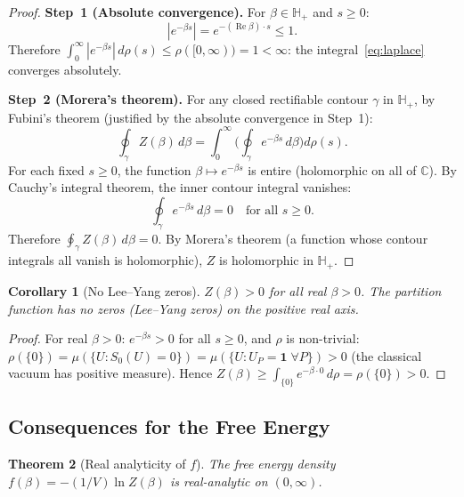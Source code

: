 \documentclass[12pt,a4paper]{article}
\theoremstyle{plain}
\newtheorem{theorem}{Theorem}[section]
\newtheorem{corollary}[theorem]{Corollary}
\theoremstyle{definition}
\theoremstyle{remark}
\begin{document}
\begin{proof}
\textbf{Step~1 (Absolute convergence).} For $\beta\in\mathbb{H}_+$ and $s\geq 0$:
\begin{equation}\label{eq:bound}
|e^{-\beta s}| = e^{-(\operatorname{Re}\beta)\cdot s} \leq 1.
\end{equation}
Therefore $\int_0^\infty|e^{-\beta s}|\,d\rho(s)\leq\rho([0,\infty))=1<\infty$: the integral~\eqref{eq:laplace} converges absolutely.

\textbf{Step~2 (Morera's theorem).} For any closed rectifiable contour $\gamma$ in $\mathbb{H}_+$, by Fubini's theorem (justified by the absolute convergence in Step~1):
\begin{equation}\label{eq:morera}
\oint_\gamma Z(\beta)\,d\beta = \int_0^\infty\!\bigg(\oint_\gamma e^{-\beta s}\,d\beta\bigg)d\rho(s).
\end{equation}
For each fixed $s\geq 0$, the function $\beta\mapsto e^{-\beta s}$ is entire (holomorphic on all of $\mathbb{C}$). By Cauchy's integral theorem, the inner contour integral vanishes:
\begin{equation}\label{eq:cauchy_inner}
\oint_\gamma e^{-\beta s}\,d\beta = 0 \quad\text{for all }s\geq 0.
\end{equation}
Therefore $\oint_\gamma Z(\beta)\,d\beta=0$. By Morera's theorem (a function whose contour integrals all vanish is holomorphic), $Z$ is holomorphic in $\mathbb{H}_+$.
\end{proof}

\begin{corollary}[No Lee--Yang zeros]\label{cor:LY}
$Z(\beta)>0$ for all real $\beta>0$. The partition function has no zeros (Lee--Yang zeros) on the positive real axis.
\end{corollary}

\begin{proof}
For real $\beta>0$: $e^{-\beta s}>0$ for all $s\geq 0$, and $\rho$ is non-trivial: $\rho(\{0\})=\mu(\{U:S_0(U)=0\})=\mu(\{U:U_P=\mathbf{1}\;\forall P\})>0$ (the classical vacuum has positive measure). Hence $Z(\beta)\geq\int_{\{0\}} e^{-\beta\cdot 0}\,d\rho = \rho(\{0\})>0$.
\end{proof}

\subsection{Consequences for the Free Energy}\label{sec:free}

\begin{theorem}[Real analyticity of $f$]\label{thm:fanalytic}
The free energy density $f(\beta)=-(1/V)\ln Z(\beta)$ is real-analytic on $(0,\infty)$.
\end{theorem}
\end{document}
